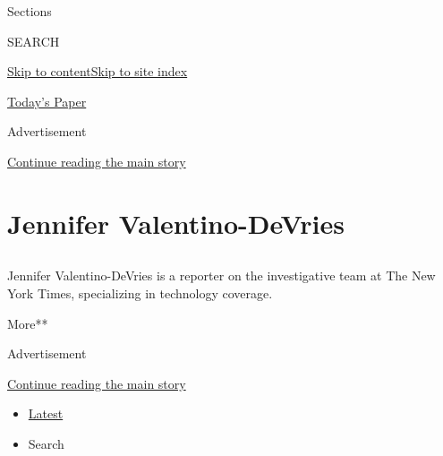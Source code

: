 Sections

SEARCH

\protect\hyperlink{site-content}{Skip to
content}\protect\hyperlink{site-index}{Skip to site index}

\href{https://myaccount.nytimes3xbfgragh.onion/auth/login?response_type=cookie\&client_id=vi}{}

\href{https://www.nytimes3xbfgragh.onion/section/todayspaper}{Today's
Paper}

Advertisement

\protect\hyperlink{after-top}{Continue reading the main story}

\hypertarget{jennifer-valentino-devries}{%
\section{Jennifer Valentino-DeVries}\label{jennifer-valentino-devries}}

\subsection{}

Jennifer Valentino-DeVries is a reporter on the investigative team at
The New York Times, specializing in technology coverage.

More**

Advertisement

\protect\hyperlink{after-mid1}{Continue reading the main story}

\begin{itemize}
\tightlist
\item
  \protect\hyperlink{stream-panel}{Latest}
\item
  Search
\end{itemize}

